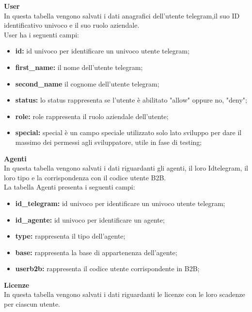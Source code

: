\textbf{User} \\ 

In questa tabella vengono salvati i dati anagrafici dell'utente telegram,il suo ID identificativo univoco e il suo ruolo aziendale. \\

User ha i seguenti campi: \\ 
\begin{itemize}
\item \textbf{id:}  id univoco per identificare un univoco utente telegram;
\item \textbf{first\_name:} il nome dell'utente telegram;
\item \textbf{second\_name } il cognome dell'utente telegram;
\item \textbf{status:} lo status rappresenta se l'utente è abilitato "allow" oppure no, "deny";
\item \textbf{role:} role rappresenta il ruolo aziendale dell'utente;
\item \textbf{special:} special è un campo speciale utilizzato solo lato sviluppo per dare il massimo dei  permessi agli sviluppatore, utile in fase di testing;
\end{itemize}

\textbf{Agenti}\\

In questa tabella vengono salvati i dati riguardanti gli agenti, il loro Idtelegram, il loro tipo e la corrispondenza con il codice utente B2B.\\

La tabella Agenti presenta i seguenti campi:\\

\begin{itemize}
\item \textbf{id\_telegram:}  id univoco per identificare un univoco utente telegram;
\item \textbf{id\_agente:}  id univoco per identificare un agente;
\item \textbf{type:} rappresenta il tipo dell'agente;
\item \textbf{base:} rappresenta la base di appartenenza dell'agente;
\item \textbf{userb2b:} rappresenta il codice utente corrispondente in B2B;
\end{itemize}



\textbf{Licenze}
\\
In questa tabella vengono salvati i dati riguardanti le licenze con le loro scadenze per ciascun utente.\\

